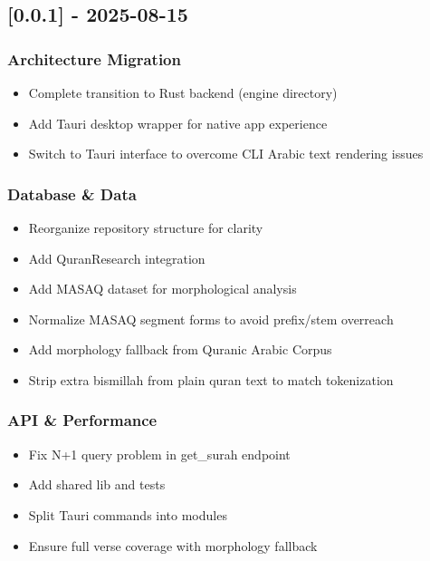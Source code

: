 \documentclass[12pt,a4paper]{article}
\providecommand{\tightlist}{\setlength{\itemsep}{0pt}\setlength{\parskip}{0pt}}
\begin{document}
\subsection{{[}0.0.1{]} - 2025-08-15}\label{section-1}

\subsubsection{Architecture Migration}\label{architecture-migration}

\begin{itemize}
\tightlist
\item
  Complete transition to Rust backend (engine directory)
\item
  Add Tauri desktop wrapper for native app experience
\item
  Switch to Tauri interface to overcome CLI Arabic text rendering issues
\end{itemize}

\subsubsection{Database \& Data}\label{database-data}

\begin{itemize}
\tightlist
\item
  Reorganize repository structure for clarity
\item
  Add QuranResearch integration
\item
  Add MASAQ dataset for morphological analysis
\item
  Normalize MASAQ segment forms to avoid prefix/stem overreach
\item
  Add morphology fallback from Quranic Arabic Corpus
\item
  Strip extra bismillah from plain quran text to match tokenization
\end{itemize}

\subsubsection{API \& Performance}\label{api-performance}

\begin{itemize}
\tightlist
\item
  Fix N+1 query problem in get\_surah endpoint
\item
  Add shared lib and tests
\item
  Split Tauri commands into modules
\item
  Ensure full verse coverage with morphology fallback
\end{itemize}
\end{document}
